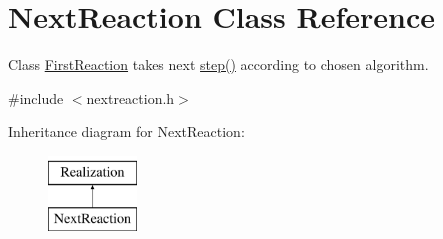 \hypertarget{class_next_reaction}{}\section{Next\+Reaction Class Reference}
\label{class_next_reaction}


Class \hyperlink{class_first_reaction}{First\+Reaction} takes next \hyperlink{class_next_reaction_a2c1502879c76efe398c2947056936725}{step()} according to chosen algorithm.  




{\ttfamily \#include $<$nextreaction.\+h$>$}

Inheritance diagram for Next\+Reaction\+:\begin{figure}[H]
\begin{center}
\leavevmode
\includegraphics[height=2.000000cm]{class_next_reaction}
\end{center}
\end{figure}
